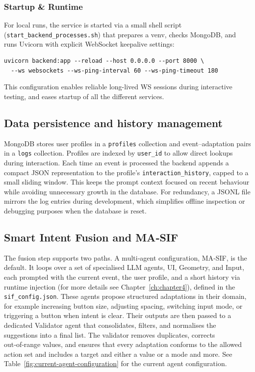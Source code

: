 \documentclass[openany]{book}
\begin{document}
\subsubsection*{Startup \& Runtime}
For local runs, the service is started via a small shell script (\texttt{start\_backend\_processes.sh}) that prepares a venv, checks MongoDB, and runs Uvicorn with explicit WebSocket keepalive settings:
\begin{lstlisting}[basicstyle=\ttfamily\small,caption={Backend startup (excerpt)}]
uvicorn backend:app --reload --host 0.0.0.0 --port 8000 \
  --ws websockets --ws-ping-interval 60 --ws-ping-timeout 180
\end{lstlisting}
This configuration enables reliable long-lived WS sessions during interactive testing, and eases startup of all the different services.

\subsection{Data persistence and history management}
MongoDB stores user profiles in a \texttt{profiles} collection and event–adaptation pairs in a \texttt{logs} collection. Profiles are indexed by \texttt{user\_id} to allow direct lookups during interaction. Each time an event is processed the backend appends a compact JSON representation to the profile’s \texttt{interaction\_history}, capped to a small sliding window. This keeps the prompt context focused on recent behaviour while avoiding unnecessary growth in the database. For redundancy, a JSONL file mirrors the log entries during development, which simplifies offline inspection or debugging purposes when the database is reset.

\subsection{Smart Intent Fusion and MA‑SIF}
The fusion step supports two paths. A multi‑agent configuration, MA‑SIF, is the default. It loops over a set of specialised LLM agents, UI, Geometry, and Input, each prompted with the current event, the user profile, and a short history via runtime injection (for more details see Chapter~\ref{ch:chapter4}), defined in the \texttt{sif\_config.json}. These agents propose structured adaptations in their domain, for example increasing button size, adjusting spacing, switching input mode, or triggering a button when intent is clear. Their outputs are then passed to a dedicated Validator agent that consolidates, filters, and normalises the suggestions into a final list. The validator removes duplicates, corrects out‑of‑range values, and ensures that every adaptation conforms to the allowed action set and includes a target and either a value or a mode and more. See Table~\ref{fig:current-agent-configuration} for the current agent configuration.
\end{document}
